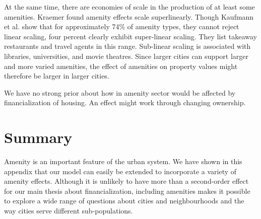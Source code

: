 At the same time, there are economies of scale in the production of at least some amenities. 
Kraemer \cite{kraemerCulturalSustainabilityUS2022} found amenity effects scale superlinearly. Though Kaufmann et al. \cite{kaufmannScalingUrbanAmenities2022}  show that %
for approximately 74\% of amenity types, they cannot reject linear scaling, four percent clearly exhibit super-linear scaling. They list takeaway restaurants and travel agents in this range. Sub-linear scaling is associated with libraries, universities, and movie theatres. Since larger cities can support larger and more varied amenities, the effect of amenities on property values might therefore be larger in larger cities.

 We have no strong prior about how in amenity sector would be affected by financialization of housing.  An effect might work through changing ownership.

  
\section{Summary}
Amenity is an important feature of the urban system. We have shown in this appendix that our model can easily be extended to incorporate a variety of amenity effects.  Although it is unlikely to have more than a second-order effect for our main thesis about financialization, including amenities makes it possible to explore a wide range of questions about cities and neighbourhoods and the way cities serve different sub-populations. 
\newpage

